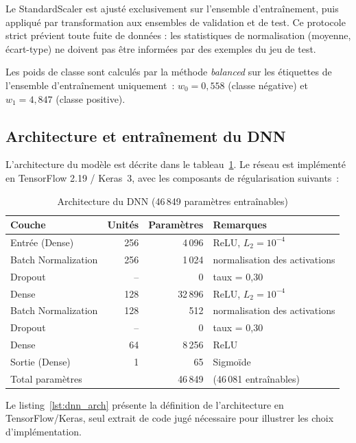 Le StandardScaler est ajusté exclusivement sur l'ensemble d'entraînement, puis
appliqué par transformation aux ensembles de validation et de test. Ce protocole
strict prévient toute fuite de données : les statistiques de normalisation
(moyenne, écart-type) ne doivent pas être informées par des exemples du jeu de test.

Les poids de classe sont calculés par la méthode \textit{balanced} sur les étiquettes
de l'ensemble d'entraînement uniquement~: $w_0 = 0{,}558$ (classe négative)
et $w_1 = 4{,}847$ (classe positive).

\subsection{Architecture et entraînement du DNN}

L'architecture du modèle est décrite dans le tableau~\ref{tab:dnn_arch_impl}.
Le réseau est implémenté en TensorFlow 2.19 / Keras~3, avec les composants
de régularisation suivants~:

\begin{table}[H]
\centering
\caption{Architecture du DNN (46\,849 paramètres entraînables)}
\label{tab:dnn_arch_impl}
\begin{tabular}{lrrl}
\toprule
\textbf{Couche} & \textbf{Unités} & \textbf{Paramètres} & \textbf{Remarques} \\
\midrule
Entrée (Dense)      & 256 & 4\,096  & ReLU, $L_2 = 10^{-4}$ \\
Batch Normalization & 256 & 1\,024  & normalisation des activations \\
Dropout             &  -- &     0   & taux = 0,30 \\
Dense               & 128 & 32\,896 & ReLU, $L_2 = 10^{-4}$ \\
Batch Normalization & 128 &   512   & normalisation des activations \\
Dropout             &  -- &     0   & taux = 0,30 \\
Dense               &  64 & 8\,256  & ReLU \\
Sortie (Dense)      &   1 &    65   & Sigmoïde \\
\midrule
\multicolumn{2}{l}{Total paramètres} & 46\,849 & (46\,081 entraînables) \\
\bottomrule
\end{tabular}
\end{table}

Le listing~\ref{lst:dnn_arch} présente la définition de l'architecture en
TensorFlow/Keras, seul extrait de code jugé nécessaire pour illustrer les
choix d'implémentation.

